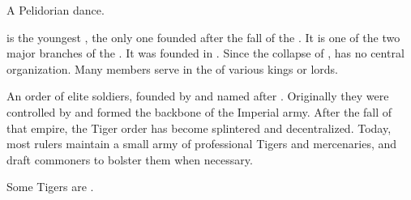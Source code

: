 \begin{gloss}
\begin{comment}
\paragraph{tacupien}
\end{comment}
A Pelidorian dance.







\begin{comment}
\paragraph{\Telcra}
\end{comment}
\gitem{\Telcra}
\index{\Telcra}
\ClanTelcra{} is the youngest , the only one founded after the fall of the . 
It is one of the two major branches of the . 
It was founded in . 
Since the collapse of \Tepharae, \ClanTelcra{} has no central organization. 
Many members serve in the  of various kings or lords. 







\begin{comment}
\paragraph{Tigers}
\end{comment}
An  order of elite soldiers, founded by and named after . 
Originally they were controlled by  and formed the backbone of the Imperial army. 
After the fall of that empire, the Tiger order has become splintered and decentralized. 
Today, most \Velcadian{} rulers maintain a small army of professional Tigers and mercenaries, and draft commoners to bolster them when necessary. 

Some Tigers are . 







\begin{comment}

\end{comment}
\end{gloss}

